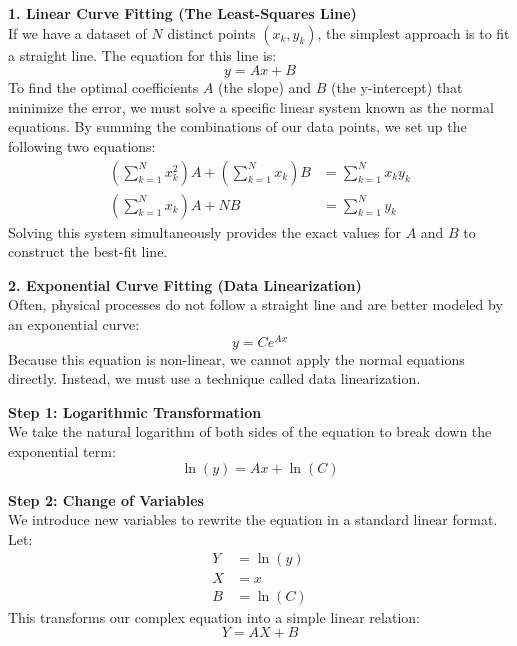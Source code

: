 \documentclass{article}
\begin{document}
\vspace{5pt}
\noindent \textbf{1. Linear Curve Fitting (The Least-Squares Line)} \cite[page 255]{MathewsFink2003} \\
If we have a dataset of $N$ distinct points $(x_k, y_k)$, the simplest approach is to fit a straight line. The equation for this line is:
\begin{equation*}
    y = Ax + B
\end{equation*}
To find the optimal coefficients $A$ (the slope) and $B$ (the y-intercept) that minimize the error, we must solve a specific linear system known as the normal equations. By summing the combinations of our data points, we set up the following two equations:
\begin{align*}
    \left(\sum_{k=1}^N x_k^2\right)A + \left(\sum_{k=1}^N x_k\right)B &= \sum_{k=1}^N x_k y_k \\
    \left(\sum_{k=1}^N x_k\right)A + N B &= \sum_{k=1}^N y_k
\end{align*}
Solving this system simultaneously provides the exact values for $A$ and $B$ to construct the best-fit line.

\vspace{5pt}
\noindent \textbf{2. Exponential Curve Fitting (Data Linearization)} \cite[page 263]{MathewsFink2003} \\
Often, physical processes do not follow a straight line and are better modeled by an exponential curve:
\begin{equation*}
    y = Ce^{Ax}
\end{equation*}
Because this equation is non-linear, we cannot apply the normal equations directly. Instead, we must use a technique called data linearization.

\vspace{5pt}
\noindent \textbf{Step 1: Logarithmic Transformation} \\
We take the natural logarithm of both sides of the equation to break down the exponential term:
\begin{equation*}
    \ln(y) = Ax + \ln(C)
\end{equation*}

\vspace{5pt}
\noindent \textbf{Step 2: Change of Variables} \\
We introduce new variables to rewrite the equation in a standard linear format. Let:
\begin{align*}
    Y &= \ln(y) \\
    X &= x \\
    B &= \ln(C)
\end{align*}
This transforms our complex equation into a simple linear relation:
\begin{equation*}
    Y = AX + B
\end{equation*}
\end{document}
